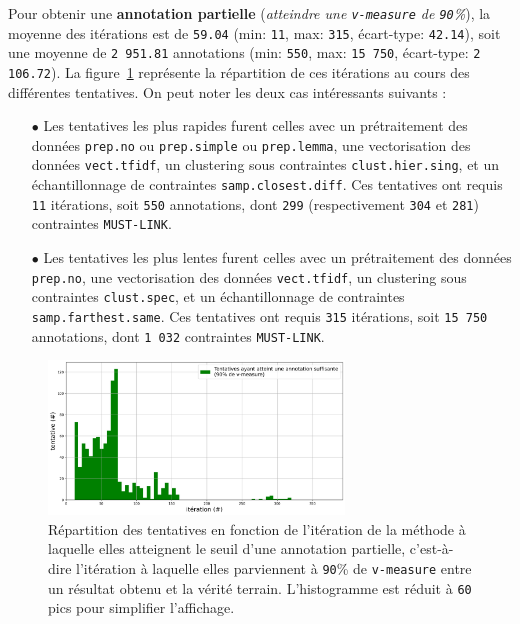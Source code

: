 			Pour obtenir une \textbf{annotation partielle} (\textit{atteindre une \texttt{v-measure} de \texttt{90}\%}), la moyenne des itérations est de \texttt{59.04} (min: \texttt{11}, max: \texttt{315}, écart-type: \texttt{42.14}), soit une moyenne de \texttt{2 951.81} annotations (min: \texttt{550}, max: \texttt{15 750}, écart-type: \texttt{2 106.72}).
			La figure~\ref{figure:4.2.1-ETUDE-OPTIMISATION-HISTOGRAMME-ANNOTATION-PARTIELLE} représente la répartition de ces itérations au cours des différentes tentatives.
			On peut noter les deux cas intéressants suivants :
			\begin{itemize}
				\item[\(\bullet\)] Les tentatives les plus rapides furent celles avec un prétraitement des données \texttt{prep.no} ou \texttt{prep.simple} ou \texttt{prep.lemma}, une vectorisation des données \texttt{vect.tfidf}, un clustering sous contraintes \texttt{clust.hier.sing}, et un échantillonnage de contraintes \texttt{samp.closest.diff}. Ces tentatives ont requis \texttt{11} itérations, soit \texttt{550} annotations, dont \texttt{299} (respectivement \texttt{304} et \texttt{281}) contraintes \texttt{MUST-LINK}.
				\item[\(\bullet\)] Les tentatives les plus lentes furent celles avec un prétraitement des données \texttt{prep.no}, une vectorisation des données \texttt{vect.tfidf}, un clustering sous contraintes \texttt{clust.spec}, et un échantillonnage de contraintes \texttt{samp.farthest.same}. Ces tentatives ont requis \texttt{315} itérations, soit \texttt{15 750} annotations, dont \texttt{1 032} contraintes \texttt{MUST-LINK}.
			\end{itemize}
			\begin{figure}[!htb]
				\centering
				\includegraphics[width=0.7\textwidth]{figures/etude-efficience-histogramme-annotation-partielle}
				\caption{Répartition des tentatives en fonction de l'itération de la méthode à laquelle elles atteignent le seuil d'une annotation partielle, c'est-à-dire l'itération à laquelle elles parviennent à \texttt{90}\% de \texttt{v-measure} entre un résultat obtenu et la vérité terrain. L'histogramme est réduit à \texttt{60} pics pour simplifier l'affichage.}
				\label{figure:4.2.1-ETUDE-OPTIMISATION-HISTOGRAMME-ANNOTATION-PARTIELLE}
			\end{figure}
